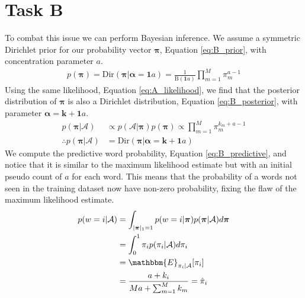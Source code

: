 \documentclass[11pt]{article}
\begin{document}
\section{Task B}
To combat this issue we can perform Bayesian inference. We assume a symmetric Dirichlet prior for our probability vector $\boldsymbol{\pi}$, Equation \ref{eq:B_prior}, with concentration parameter $a$.
\begin{equation}
    \begin{aligned}
        p(\boldsymbol{\pi}) = \text{Dir}(\boldsymbol{\pi} | \boldsymbol{\alpha} = \boldsymbol{1} a) = \frac{1}{\text{B}(\boldsymbol{1} a)} \prod_{m=1}^{M} \pi_m^{a - 1}
    \end{aligned}
    \label{eq:B_prior}
\end{equation}
Using the same likelihood, Equation \ref{eq:A_likelihood}, we find that the posterior distribution of $\boldsymbol{\pi}$ is also a Dirichlet distribution, Equation \ref{eq:B_posterior}, with parameter $\boldsymbol{\alpha} = \boldsymbol{k} + \boldsymbol{1} a$.
\begin{equation}
    \begin{aligned}
        p(\boldsymbol{\pi} | \mathcal{A}) &\propto p(\mathcal{A} | \boldsymbol{\pi}) p(\boldsymbol{\pi}) \propto \prod_{m=1}^{M} \pi_m^{k_m + a - 1} \\
        \therefore p(\boldsymbol{\pi} | \mathcal{A}) &= \text{Dir}(\boldsymbol{\pi} | \boldsymbol{\alpha} = \boldsymbol{k} + \boldsymbol{1} a)
    \end{aligned}
    \label{eq:B_posterior}
\end{equation}
We compute the predictive word probability, Equation \ref{eq:B_predictive}, and notice that it is similar to the maximum likelihood estimate but with an initial pseudo count of $a$ for each word. This means that the probability of a words not seen in the training dataset now have non-zero probability, fixing the flaw of the maximum likelihood estimate.
\begin{equation}
    \begin{aligned}
        p(w = i | \mathcal{A}) &= \int_{|\boldsymbol{\pi}|_1=1} p(w = i | \boldsymbol{\pi}) p(\boldsymbol{\pi} | \mathcal{A}) d\boldsymbol{\pi} \\
          &= \int_{0}^{1} \pi_i p(\pi_i | \mathcal{A}) d\pi_i \\
          &= \mathbbm{E}_{\pi_i|\mathcal{A}}[\pi_i] \\
          &= \frac{a + k_i}{M a + \sum_{m=1}^{M} k_m} = \hat \pi_i \\
    \end{aligned}
    \label{eq:B_predictive}
\end{equation}
\end{document}
